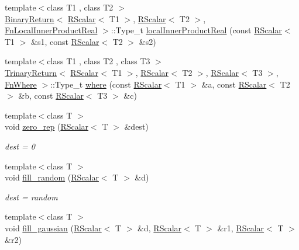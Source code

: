 \begin{DoxyCompactItemize}
\item 
{\footnotesize template$<$class T1 , class T2 $>$ }\\\mbox{\hyperlink{structENSEM_1_1BinaryReturn}{Binary\+Return}}$<$ \mbox{\hyperlink{classENSEM_1_1RScalar}{R\+Scalar}}$<$ T1 $>$, \mbox{\hyperlink{classENSEM_1_1RScalar}{R\+Scalar}}$<$ T2 $>$, \mbox{\hyperlink{structENSEM_1_1FnLocalInnerProductReal}{Fn\+Local\+Inner\+Product\+Real}} $>$\+::Type\+\_\+t \mbox{\hyperlink{group__rscalar_gafd6d5a4377919b182f234ffe0eea09b4}{local\+Inner\+Product\+Real}} (const \mbox{\hyperlink{classENSEM_1_1RScalar}{R\+Scalar}}$<$ T1 $>$ \&s1, const \mbox{\hyperlink{classENSEM_1_1RScalar}{R\+Scalar}}$<$ T2 $>$ \&s2)
\item 
{\footnotesize template$<$class T1 , class T2 , class T3 $>$ }\\\mbox{\hyperlink{structENSEM_1_1TrinaryReturn}{Trinary\+Return}}$<$ \mbox{\hyperlink{classENSEM_1_1RScalar}{R\+Scalar}}$<$ T1 $>$, \mbox{\hyperlink{classENSEM_1_1RScalar}{R\+Scalar}}$<$ T2 $>$, \mbox{\hyperlink{classENSEM_1_1RScalar}{R\+Scalar}}$<$ T3 $>$, \mbox{\hyperlink{structENSEM_1_1FnWhere}{Fn\+Where}} $>$\+::Type\+\_\+t \mbox{\hyperlink{group__rscalar_gab32228a08de8d1e17ba1f7829c1aff56}{where}} (const \mbox{\hyperlink{classENSEM_1_1RScalar}{R\+Scalar}}$<$ T1 $>$ \&a, const \mbox{\hyperlink{classENSEM_1_1RScalar}{R\+Scalar}}$<$ T2 $>$ \&b, const \mbox{\hyperlink{classENSEM_1_1RScalar}{R\+Scalar}}$<$ T3 $>$ \&c)
\item 
{\footnotesize template$<$class T $>$ }\\void \mbox{\hyperlink{group__rscalar_ga2d621f22841a02293225a92dcfcb4642}{zero\+\_\+rep}} (\mbox{\hyperlink{classENSEM_1_1RScalar}{R\+Scalar}}$<$ T $>$ \&dest)
\begin{DoxyCompactList}\small\item\em dest = 0 \end{DoxyCompactList}\item 
{\footnotesize template$<$class T $>$ }\\void \mbox{\hyperlink{group__rscalar_ga02bacd2a18d81f6f0e7d137a7d21ee23}{fill\+\_\+random}} (\mbox{\hyperlink{classENSEM_1_1RScalar}{R\+Scalar}}$<$ T $>$ \&d)
\begin{DoxyCompactList}\small\item\em dest = random \end{DoxyCompactList}\item 
{\footnotesize template$<$class T $>$ }\\void \mbox{\hyperlink{group__rscalar_gaaefd5c2ab83b53fd225f3198277789f3}{fill\+\_\+gaussian}} (\mbox{\hyperlink{classENSEM_1_1RScalar}{R\+Scalar}}$<$ T $>$ \&d, \mbox{\hyperlink{classENSEM_1_1RScalar}{R\+Scalar}}$<$ T $>$ \&r1, \mbox{\hyperlink{classENSEM_1_1RScalar}{R\+Scalar}}$<$ T $>$ \&r2)

\end{DoxyCompactItemize}
